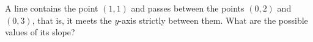 A line contains the point $(1,1)$ and passes between the points $(0,2)$ and $(0,3)$, that is, it meets the $y$-axis strictly between them. What are the possible values of its slope?
